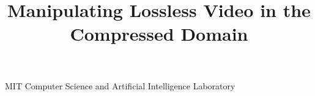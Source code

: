 \documentclass[preprint,nocopyrightspace]{sigplanconf}
\begin{document}


\title{Manipulating Lossless Video in the Compressed Domain}


           {MIT Computer Science and Artificial Intelligence Laboratory}

\maketitle

\begin{abstract}

\end{abstract}







%


%


\end{document}
